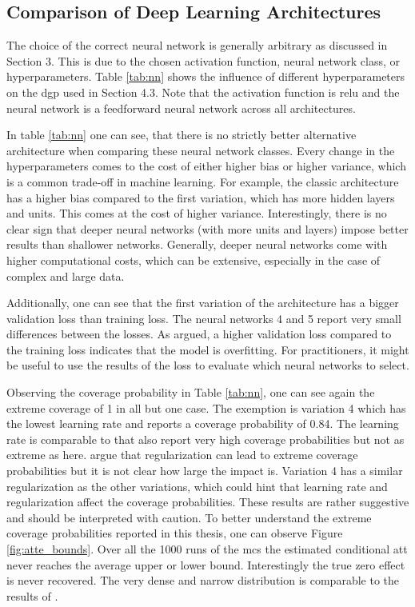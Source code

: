 \subsection{Comparison of Deep Learning Architectures}

The choice of the correct neural network is generally arbitrary as discussed in Section 3.
This is due to the chosen activation function, neural network class, or hyperparameters.
Table \ref{tab:nn} shows the influence of different hyperparameters on the \ac{dgp} used in Section 4.3.
Note that the activation function is \ac{relu} and the neural network is a feedforward neural network across all architectures.

In table \ref{tab:nn} one can see, that there is no strictly better alternative architecture when comparing these neural network classes.
Every change in the hyperparameters comes to the cost of either higher bias or higher variance, which is a common trade-off in machine learning.
For example, the classic architecture has a higher bias compared to the first variation, which has more hidden layers and units.
This comes at the cost of higher variance.
Interestingly, there is no clear sign that deeper neural networks (with more units and layers) impose better results than shallower networks.
Generally, deeper neural networks come with higher computational costs, which can be extensive, especially in the case of complex and large data.

Additionally, one can see that the first variation of the architecture has a bigger validation loss than training loss.
The neural networks 4 and 5 report very small differences between the losses.
As argued, a higher validation loss compared to the training loss indicates that the model is overfitting.
For practitioners, it might be useful to use the results of the loss to evaluate which neural networks to select.



Observing the coverage probability in Table \ref{tab:nn}, one can see again the extreme coverage of 1 in all but one case.
The exemption is variation 4 which has the lowest learning rate and reports a coverage probability of 0.84.
The learning rate is comparable to \citet{farrellDeepNeuralNetworks2021} that also report very high coverage probabilities but not as extreme as here.
\citet{farrellDeepNeuralNetworks2021} argue that regularization can lead to extreme coverage probabilities but it is not clear how large the impact is.
Variation 4 has a similar regularization as the other variations, which could hint that learning rate and regularization affect the coverage probabilities.
These results are rather suggestive and should be interpreted with caution.
To better understand the extreme coverage probabilities reported in this thesis, one can observe Figure \ref{fig:atte_bounds}.
Over all the 1000 runs of the \ac{mcs} the estimated conditional \ac{att} never reaches the average upper or lower bound.
Interestingly the true zero effect is never recovered.
The very dense and narrow distribution is comparable to the results of \citet{farrellDeepNeuralNetworks2021}.

